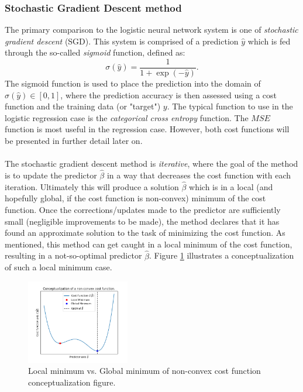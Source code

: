         \subsubsection{Stochastic Gradient Descent method}
            The primary comparison to the logistic neural network system is one of \textit{stochastic gradient descent} (SGD). This system is comprised of a prediction $\hat{y}$ which is fed through the so-called \textit{sigmoid} function, defined as:
            \begin{equation}\label{eq:sigmoid}
                \sigma (\hat{y}) = \frac{1}{1+\exp(-\hat{y})}.
            \end{equation}
            The sigmoid function is used to place the prediction into the domain of $\sigma(\hat{y}) \in [0,1]$, where the prediction accuracy is then assessed using a cost function and the training data (or "target") $y$. The typical function to use in the logistic regression case is the \textit{categorical cross entropy} function. The $MSE$ function is most useful in the regression case. However, both cost functions will be presented in further detail later on.\\\\ 
            The stochastic gradient descent method is \textit{iterative}, where the goal of the method is to update the predictor $\hat{\beta}$ in a way that decreases the cost function with each iteration. Ultimately this will produce a solution $\hat{\beta}$ which is in a local (and hopefully global, if the cost function is non-convex) minimum of the cost function. Once the corrections/updates made to the predictor are sufficiently small (negligible improvements to be made), the method declares that it has found an approximate solution to the task of minimizing the cost function. As mentioned, this method can get caught in a local minimum of the cost function, resulting in a not-so-optimal predictor $\hat{\beta}$. Figure \ref{fig:local_min} illustrates a conceptualization of such a local minimum case.
            \begin{figure}[H]
                \centering
                \includegraphics[width=0.4\textwidth]{figures/local_min_concept.png}
                \caption{Local minimum vs. Global minimum of non-convex cost function conceptualization figure.}
                \label{fig:local_min}
            \end{figure}
